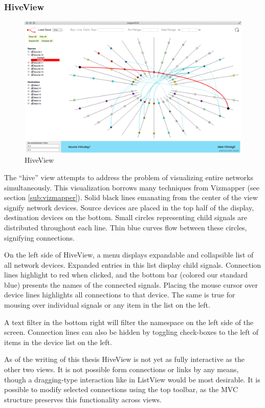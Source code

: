 	\subsubsection{HiveView}

\begin{figure}[ht]
\centering
	\includegraphics[width=\textwidth]{figures/hive}
\caption{HiveView}
\label{fig:hive}
\end{figure}
	
The ``hive'' view attempts to address the problem of visualizing entire networks simultaneously. This visualization borrows many techniques from Vizmapper (see section \ref{sub:vizmapper}). Solid black lines emanating from the center of the view signify network devices. Source devices are placed in the top half of the display, destination devices on the bottom. Small circles representing child signals are distributed throughout each line. Thin blue curves flow between these circles, signifying connections. 

On the left side of HiveView, a menu displays expandable and collapsible list of all network devices. Expanded entries in this list display child signals. Connection lines highlight to red when clicked, and the bottom bar (colored our standard blue) presents the names of the connected signals. Placing the mouse cursor over device lines highlights all connections to that device. The same is true for mousing over individual signals or any item in the list on the left.

A text filter in the bottom right will filter the namespace on the left side of the screen. Connection lines can also be hidden by toggling check-boxes to the left of items in the device list on the left.

As of the writing of this thesis HiveView is not yet as fully interactive as the other two views. It is not possible form connections or links by any means, though a dragging-type interaction like in ListView would be most desirable. It is possible to modify selected connections using the top toolbar, as the MVC structure preserves this functionality across views.

